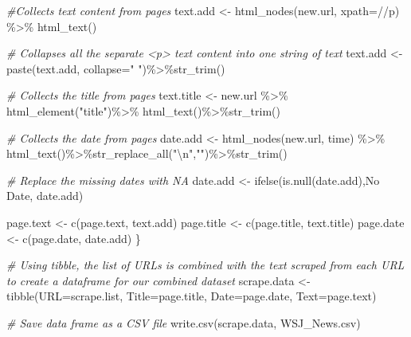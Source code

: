 \documentclass[
]{article}
\newenvironment{Shaded}{\begin{snugshade}}{\end{snugshade}}
\newcommand{\AttributeTok}[1]{\textcolor[rgb]{0.77,0.63,0.00}{#1}}
\newcommand{\CommentTok}[1]{\textcolor[rgb]{0.56,0.35,0.01}{\textit{#1}}}
\newcommand{\FunctionTok}[1]{\textcolor[rgb]{0.00,0.00,0.00}{#1}}
\newcommand{\NormalTok}[1]{#1}
\newcommand{\OtherTok}[1]{\textcolor[rgb]{0.56,0.35,0.01}{#1}}
\newcommand{\SpecialCharTok}[1]{\textcolor[rgb]{0.00,0.00,0.00}{#1}}
\newcommand{\StringTok}[1]{\textcolor[rgb]{0.31,0.60,0.02}{#1}}
\begin{document}
\begin{Shaded}
\begin{Highlighting}[]
  \CommentTok{\#Collects text content from pages}
\NormalTok{  text.add }\OtherTok{\textless{}{-}} \FunctionTok{html\_nodes}\NormalTok{(new.url, }\AttributeTok{xpath=}\StringTok{\textquotesingle{}//p\textquotesingle{}}\NormalTok{) }\SpecialCharTok{\%\textgreater{}\%}
    \FunctionTok{html\_text}\NormalTok{()}
  
  \CommentTok{\# Collapses all the separate \textless{}p\textgreater{} text content into one string of text}
\NormalTok{  text.add }\OtherTok{\textless{}{-}} \FunctionTok{paste}\NormalTok{(text.add, }\AttributeTok{collapse=}\StringTok{" "}\NormalTok{)}\SpecialCharTok{\%\textgreater{}\%}\FunctionTok{str\_trim}\NormalTok{()}
  
  
  \CommentTok{\# Collects the title from pages}
\NormalTok{  text.title }\OtherTok{\textless{}{-}}\NormalTok{ new.url }\SpecialCharTok{\%\textgreater{}\%} \FunctionTok{html\_element}\NormalTok{(}\StringTok{"title"}\NormalTok{)}\SpecialCharTok{\%\textgreater{}\%}
    \FunctionTok{html\_text}\NormalTok{()}\SpecialCharTok{\%\textgreater{}\%}\FunctionTok{str\_trim}\NormalTok{()}
  
  \CommentTok{\# Collects the date from pages}
\NormalTok{  date.add }\OtherTok{\textless{}{-}} \FunctionTok{html\_nodes}\NormalTok{(new.url, }\StringTok{\textquotesingle{}time\textquotesingle{}}\NormalTok{) }\SpecialCharTok{\%\textgreater{}\%}
    \FunctionTok{html\_text}\NormalTok{()}\SpecialCharTok{\%\textgreater{}\%}\FunctionTok{str\_replace\_all}\NormalTok{(}\StringTok{"}\SpecialCharTok{\textbackslash{}n}\StringTok{"}\NormalTok{,}\StringTok{""}\NormalTok{)}\SpecialCharTok{\%\textgreater{}\%}\FunctionTok{str\_trim}\NormalTok{()}
  
  \CommentTok{\# Replace the missing dates with NA}
\NormalTok{  date.add }\OtherTok{\textless{}{-}} \FunctionTok{ifelse}\NormalTok{(}\FunctionTok{is.null}\NormalTok{(date.add),}\StringTok{\textquotesingle{}No Date\textquotesingle{}}\NormalTok{, date.add)}
  
\NormalTok{  page.text }\OtherTok{\textless{}{-}} \FunctionTok{c}\NormalTok{(page.text, text.add)}
\NormalTok{  page.title }\OtherTok{\textless{}{-}} \FunctionTok{c}\NormalTok{(page.title, text.title)}
\NormalTok{  page.date }\OtherTok{\textless{}{-}} \FunctionTok{c}\NormalTok{(page.date, date.add)}
\NormalTok{\}}


\CommentTok{\# Using tibble, the list of URLs is combined with the text scraped from each URL to create a dataframe for our combined dataset}
\NormalTok{scrape.data }\OtherTok{\textless{}{-}} \FunctionTok{tibble}\NormalTok{(}\StringTok{\textquotesingle{}URL\textquotesingle{}}\OtherTok{=}\NormalTok{scrape.list, }\StringTok{\textquotesingle{}Title\textquotesingle{}}\OtherTok{=}\NormalTok{page.title, }\StringTok{\textquotesingle{}Date\textquotesingle{}}\OtherTok{=}\NormalTok{page.date, }\StringTok{\textquotesingle{}Text\textquotesingle{}}\OtherTok{=}\NormalTok{page.text)}


\CommentTok{\# Save data frame as a CSV file}
\FunctionTok{write.csv}\NormalTok{(scrape.data, }\StringTok{\textquotesingle{}WSJ\_News.csv\textquotesingle{}}\NormalTok{)}
\end{Highlighting}
\end{Shaded}
\end{document}
